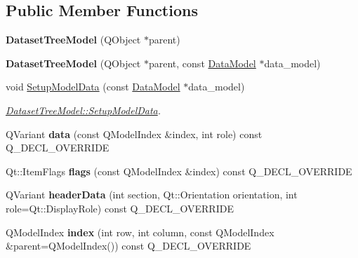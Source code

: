 \subsection*{Public Member Functions}
\begin{DoxyCompactItemize}
\item 
{\bfseries Dataset\+Tree\+Model} (Q\+Object $\ast$parent)\hypertarget{class_dataset_tree_model_ab5225c75a58682f12bed8eeb5342d57c}{}\label{class_dataset_tree_model_ab5225c75a58682f12bed8eeb5342d57c}

\item 
{\bfseries Dataset\+Tree\+Model} (Q\+Object $\ast$parent, const \hyperlink{class_data_model}{Data\+Model} $\ast$data\+\_\+model)\hypertarget{class_dataset_tree_model_af1085ae203d04401068a43e29f93584e}{}\label{class_dataset_tree_model_af1085ae203d04401068a43e29f93584e}

\item 
void \hyperlink{class_dataset_tree_model_a6b790c46fce2661df22f977568747799}{Setup\+Model\+Data} (const \hyperlink{class_data_model}{Data\+Model} $\ast$data\+\_\+model)
\begin{DoxyCompactList}\small\item\em \hyperlink{class_dataset_tree_model_a6b790c46fce2661df22f977568747799}{Dataset\+Tree\+Model\+::\+Setup\+Model\+Data}. \end{DoxyCompactList}\item 
Q\+Variant {\bfseries data} (const Q\+Model\+Index \&index, int role) const Q\+\_\+\+D\+E\+C\+L\+\_\+\+O\+V\+E\+R\+R\+I\+DE\hypertarget{class_dataset_tree_model_abee1d278c2e76b6f758f5ecf60a58609}{}\label{class_dataset_tree_model_abee1d278c2e76b6f758f5ecf60a58609}

\item 
Qt\+::\+Item\+Flags {\bfseries flags} (const Q\+Model\+Index \&index) const Q\+\_\+\+D\+E\+C\+L\+\_\+\+O\+V\+E\+R\+R\+I\+DE\hypertarget{class_dataset_tree_model_a2a121ff1099f33efc89e85274b234d69}{}\label{class_dataset_tree_model_a2a121ff1099f33efc89e85274b234d69}

\item 
Q\+Variant {\bfseries header\+Data} (int section, Qt\+::\+Orientation orientation, int role=Qt\+::\+Display\+Role) const Q\+\_\+\+D\+E\+C\+L\+\_\+\+O\+V\+E\+R\+R\+I\+DE\hypertarget{class_dataset_tree_model_acaedaa126d810cf90e8428e656667281}{}\label{class_dataset_tree_model_acaedaa126d810cf90e8428e656667281}

\item 
Q\+Model\+Index {\bfseries index} (int row, int column, const Q\+Model\+Index \&parent=Q\+Model\+Index()) const Q\+\_\+\+D\+E\+C\+L\+\_\+\+O\+V\+E\+R\+R\+I\+DE\hypertarget{class_dataset_tree_model_ad77d80cbb89b328c1e4b907f75d97bb7}{}\label{class_dataset_tree_model_ad77d80cbb89b328c1e4b907f75d97bb7}


\end{DoxyCompactItemize}
